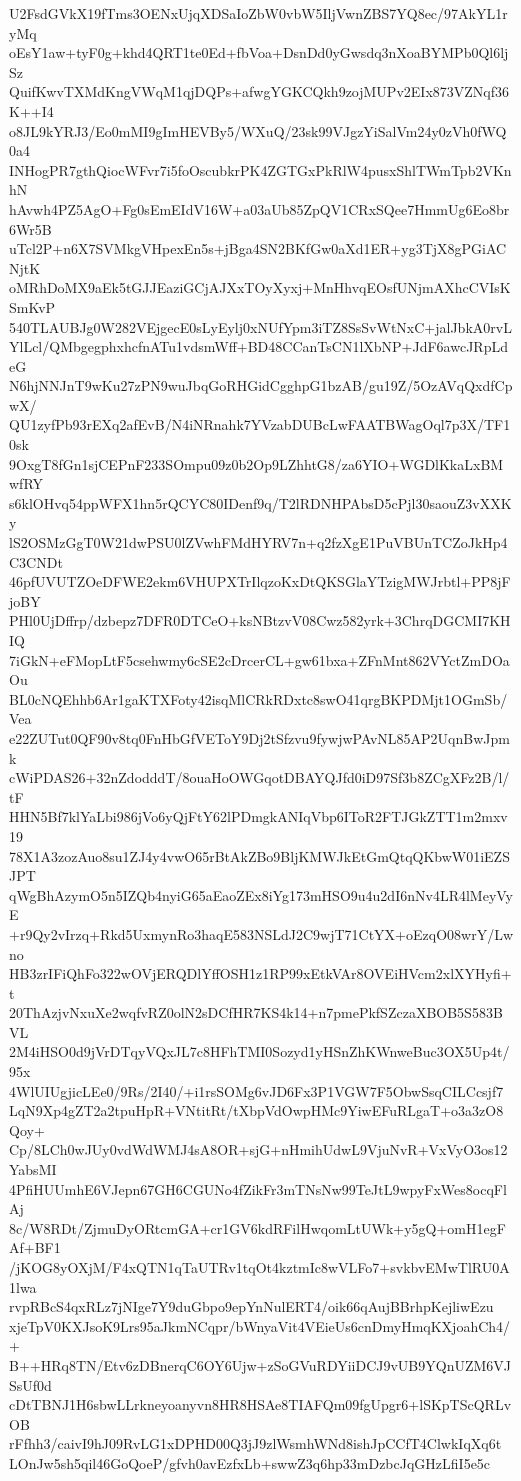 U2FsdGVkX19fTms3OENxUjqXDSaIoZbW0vbW5IljVwnZBS7YQ8ec/97AkYL1ryMq
oEsY1aw+tyF0g+khd4QRT1te0Ed+fbVoa+DsnDd0yGwsdq3nXoaBYMPb0Ql6ljSz
QuifKwvTXMdKngVWqM1qjDQPs+afwgYGKCQkh9zojMUPv2EIx873VZNqf36K++I4
o8JL9kYRJ3/Eo0mMI9gImHEVBy5/WXuQ/23sk99VJgzYiSalVm24y0zVh0fWQ0a4
INHogPR7gthQiocWFvr7i5foOscubkrPK4ZGTGxPkRlW4pusxShlTWmTpb2VKnhN
hAvwh4PZ5AgO+Fg0sEmEIdV16W+a03aUb85ZpQV1CRxSQee7HmmUg6Eo8br6Wr5B
uTcl2P+n6X7SVMkgVHpexEn5s+jBga4SN2BKfGw0aXd1ER+yg3TjX8gPGiACNjtK
oMRhDoMX9aEk5tGJJEaziGCjAJXxTOyXyxj+MnHhvqEOsfUNjmAXhcCVIsKSmKvP
540TLAUBJg0W282VEjgecE0sLyEylj0xNUfYpm3iTZ8SsSvWtNxC+jalJbkA0rvL
YlLcl/QMbgegphxhcfnATu1vdsmWff+BD48CCanTsCN1lXbNP+JdF6awcJRpLdeG
N6hjNNJnT9wKu27zPN9wuJbqGoRHGidCgghpG1bzAB/gu19Z/5OzAVqQxdfCpwX/
QU1zyfPb93rEXq2afEvB/N4iNRnahk7YVzabDUBcLwFAATBWagOql7p3X/TF10sk
9OxgT8fGn1sjCEPnF233SOmpu09z0b2Op9LZhhtG8/za6YIO+WGDlKkaLxBMwfRY
s6klOHvq54ppWFX1hn5rQCYC80IDenf9q/T2lRDNHPAbsD5cPjl30saouZ3vXXKy
lS2OSMzGgT0W21dwPSU0lZVwhFMdHYRV7n+q2fzXgE1PuVBUnTCZoJkHp4C3CNDt
46pfUVUTZOeDFWE2ekm6VHUPXTrIlqzoKxDtQKSGlaYTzigMWJrbtl+PP8jFjoBY
PHl0UjDffrp/dzbepz7DFR0DTCeO+ksNBtzvV08Cwz582yrk+3ChrqDGCMI7KHIQ
7iGkN+eFMopLtF5csehwmy6cSE2cDrcerCL+gw61bxa+ZFnMnt862VYctZmDOaOu
BL0cNQEhhb6Ar1gaKTXFoty42isqMlCRkRDxtc8swO41qrgBKPDMjt1OGmSb/Vea
e22ZUTut0QF90v8tq0FnHbGfVEToY9Dj2tSfzvu9fywjwPAvNL85AP2UqnBwJpmk
cWiPDAS26+32nZdodddT/8ouaHoOWGqotDBAYQJfd0iD97Sf3b8ZCgXFz2B/l/tF
HHN5Bf7klYaLbi986jVo6yQjFtY62lPDmgkANIqVbp6IToR2FTJGkZTT1m2mxv19
78X1A3zozAuo8su1ZJ4y4vwO65rBtAkZBo9BljKMWJkEtGmQtqQKbwW01iEZSJPT
qWgBhAzymO5n5IZQb4nyiG65aEaoZEx8iYg173mHSO9u4u2dI6nNv4LR4lMeyVyE
+r9Qy2vIrzq+Rkd5UxmynRo3haqE583NSLdJ2C9wjT71CtYX+oEzqO08wrY/Lwno
HB3zrIFiQhFo322wOVjERQDlYffOSH1z1RP99xEtkVAr8OVEiHVcm2xlXYHyfi+t
20ThAzjvNxuXe2wqfvRZ0olN2sDCfHR7KS4k14+n7pmePkfSZczaXBOB5S583BVL
2M4iHSO0d9jVrDTqyVQxJL7c8HFhTMI0Sozyd1yHSnZhKWnweBuc3OX5Up4t/95x
4WlUIUgjicLEe0/9Rs/2I40/+i1rsSOMg6vJD6Fx3P1VGW7F5ObwSsqCILCcsjf7
LqN9Xp4gZT2a2tpuHpR+VNtitRt/tXbpVdOwpHMc9YiwEFuRLgaT+o3a3zO8Qoy+
Cp/8LCh0wJUy0vdWdWMJ4sA8OR+sjG+nHmihUdwL9VjuNvR+VxVyO3os12YabsMI
4PfiHUUmhE6VJepn67GH6CGUNo4fZikFr3mTNsNw99TeJtL9wpyFxWes8ocqFlAj
8c/W8RDt/ZjmuDyORtcmGA+cr1GV6kdRFilHwqomLtUWk+y5gQ+omH1egFAf+BF1
/jKOG8yOXjM/F4xQTN1qTaUTRv1tqOt4kztmIc8wVLFo7+svkbvEMwTlRU0A1lwa
rvpRBcS4qxRLz7jNIge7Y9duGbpo9epYnNulERT4/oik66qAujBBrhpKejliwEzu
xjeTpV0KXJsoK9Lrs95aJkmNCqpr/bWnyaVit4VEieUs6cnDmyHmqKXjoahCh4/+
B++HRq8TN/Etv6zDBnerqC6OY6Ujw+zSoGVuRDYiiDCJ9vUB9YQnUZM6VJSsUf0d
cDtTBNJ1H6sbwLLrkneyoanyvn8HR8HSAe8TIAFQm09fgUpgr6+lSKpTScQRLvOB
rFfhh3/caivI9hJ09RvLG1xDPHD00Q3jJ9zlWsmhWNd8ishJpCCfT4ClwkIqXq6t
LOnJw5sh5qil46GoQoeP/gfvh0avEzfxLb+swwZ3q6hp33mDzbcJqGHzLfiI5e5c
